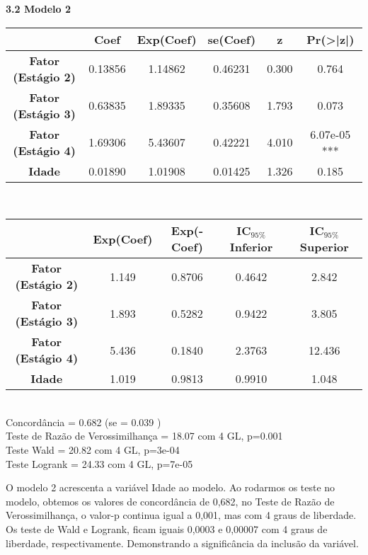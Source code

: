 \documentclass[12pt,a4paper]{article}
\begin{document}
 	\textbf{3.2 Modelo 2}\\
 	\begin{center}
 		\begin{tabular}{|c|c|c|c|c|c|}\hline
 			& \textbf{Coef} & \textbf{Exp(Coef)} & \textbf{se(Coef)} & \textbf{z} & \textbf{Pr(>|z|)}\\ \hline   
 			\textbf{Fator (Estágio 2)} & 0.13856 & 1.14862 & 0.46231 & 0.300 &   0.764\\ \hline 
 			\textbf{Fator (Estágio 3)} & 0.63835 & 1.89335 & 0.35608 & 1.793 & 0.073\\ \hline 
 			\textbf{Fator (Estágio 4)} & 1.69306 & 5.43607 & 0.42221 & 4.010 & 6.07e-05 ***\\ \hline 
 			\textbf{Idade} & 0.01890 & 1.01908 & 0.01425 & 1.326 & 0.185\\ \hline 
 		\end{tabular}
 		\vspace{1cm}\\
 		\begin{tabular}{|c|c|c|c|c|}\hline
 			& \textbf{Exp(Coef)} & \textbf{Exp(-Coef)} & \textbf{IC$_{95\%}$ Inferior} & \textbf{IC$_{95\%}$ Superior}\\ \hline
 			\textbf{Fator (Estágio 2)} & 1.149 & 0.8706 & 0.4642 & 2.842\\ \hline
 			\textbf{Fator (Estágio 3)} & 1.893 & 0.5282 & 0.9422 & 3.805\\ \hline
 			\textbf{Fator (Estágio 4)} & 5.436 & 0.1840 & 2.3763 & 12.436\\ \hline
 			\textbf{Idade} & 1.019 & 0.9813 & 0.9910 & 1.048\\ \hline
 		\end{tabular}
 		\vspace{0.25cm}\\
 		Concordância = 0.682  (se = 0.039 )\\
 		Teste de Razão de Verossimilhança  = 18.07  com 4 GL,   p=0.001\\
 		Teste Wald = 20.82  com 4 GL,   p=3e-04\\
 		Teste Logrank = 24.33  com 4 GL,   p=7e-05\\
 	\end{center}
 	\vspace{1cm}
 	O modelo 2 acrescenta a variável Idade ao modelo. Ao rodarmos os teste no modelo, obtemos os valores de concordância de 0,682, no Teste de Razão de Verossimilhança, o valor-p continua igual a 0,001, mas com 4 graus de liberdade. Os teste de Wald e Logrank, ficam iguais 0,0003  e 0,00007 com 4 graus de liberdade, respectivamente. Demonstrando a significância da inclusão da variável.  
\end{document}

